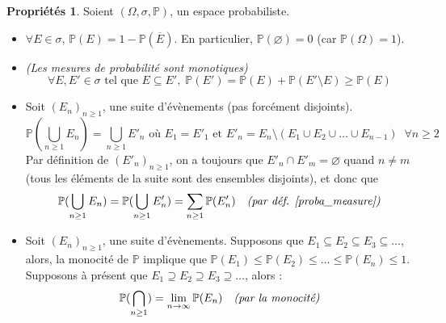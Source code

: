 \documentclass[12pt,a4paper]{report}
\theoremstyle{definition}%
\newtheorem*{proprietes}{Propriétés}
\theoremstyle{remark}
\let\labelitemi\labelitemii
\begin{document}
\begin{proprietes}
	Soient $(\Omega, \sigma, \mathbb{P})$, un espace probabiliste.
	
	\begin{itemize}
		\renewcommand{\labelitemi}{\tiny$\bullet$}
		\item $\forall E \in \sigma$, $\mathbb{P}(E) = 1 - \mathbb{P}(\overline{E})$. En particulier, $\mathbb{P}(\varnothing) = 0$ (car $\mathbb{P}(\Omega) = 1$).
		\item \textit{(Les mesures de probabilité sont monotiques)} \[\forall E, E' \in \sigma \text{ tel que } E \subseteq E',\; \mathbb{P}(E') = \mathbb{P}(E) + \mathbb{P}(E' \setminus E) \geq \mathbb{P}(E)\]
		\item Soit $(E_n)_{n \geq 1}$, une suite d'évènements (pas forcément disjoints). \[\mathbb{P}(\bigcup_{n \geq 1} E_n) = \bigcup_{n \geq 1} E'_n \text{ où }E_1 = E'_1\text{ et }E'_n = E_n \setminus (E_1 \cup E_2 \cup \dots \cup E_{n-1}) \;\; \forall n \geq 2\]
		Par définition de $(E'_n)_{n \geq 1}$, on a toujours que $E'_n \cap E'_m = \varnothing$ quand $n \neq m$ (tous les éléments de la suite sont des ensembles disjoints), et donc que
		\[ \mathbb{P}(\bigcup_{n \geq 1} E_n) =  \mathbb{P}(\bigcup_{n \geq 1} E'_n) = \sum_{n \geq 1}\mathbb{P}(E'_n) \quad \text{\textit{(par déf. \ref{proba_measure})}}\]
		\item Soit $(E_n)_{n \geq 1}$, une suite d'évènements. Supposons que $E_1 \subseteq E_2 \subseteq E_3 \subseteq \dots $, alors, la monocité de $\mathbb{P}$ implique que $\mathbb{P}(E_1) \leq \mathbb{P}(E_2) \leq \dots \leq \mathbb{P}(E_n) \leq 1$.
		Supposons à présent que $E_1 \supseteq E_2 \supseteq E_3 \supseteq \dots$, alors :
		\[ \mathbb{P}(\bigcap_{n \geq 1}) = \lim_{n \rightarrow \infty} \mathbb{P}(E_n) \quad \text{\textit{(par la monocité)}}\]
	\end{itemize}
\end{proprietes}
\end{document}
